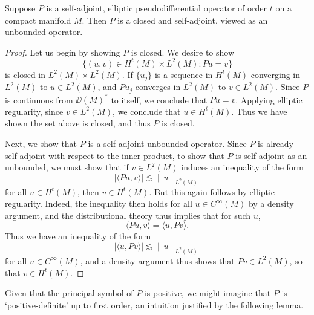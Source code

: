 \begin{theorem}
    Suppose $P$ is a self-adjoint, elliptic pseudodifferential operator of order $t$ on a compact manifold $M$. Then $P$ is a closed and self-adjoint, viewed as an unbounded operator.
\end{theorem}
\begin{proof}
    Let us begin by showing $P$ is closed. We desire to show
    \[ \{ (u,v) \in H^t(M) \times L^2(M) : Pu = v \} \]
    is closed in $L^2(M) \times L^2(M)$. If $\{ u_j \}$ is a sequence in $H^t(M)$ converging in $L^2(M)$ to $u \in L^2(M)$, and $Pu_j$ converges in $L^2(M)$ to $v \in L^2(M)$. Since $P$ is continuous from $\DD(M)^*$ to itself, we conclude that $Pu = v$. Applying elliptic regularity, since $v \in L^2(M)$, we conclude that $u \in H^t(M)$. Thus we have shown the set above is closed, and thus $P$ is closed.

    Next, we show that $P$ is a self-adjoint unbounded operator. Since $P$ is already self-adjoint with respect to the inner product, to show that $P$ is self-adjoint as an unbounded, we must show that if $v \in L^2(M)$ induces an inequality of the form
    \[ |\langle Pu, v \rangle| \lesssim \| u \|_{L^2(M)} \]
    for all $u \in H^t(M)$, then $v \in H^t(M)$. But this again follows by elliptic regularity. Indeed, the inequality then holds for all $u \in C^\infty(M)$ by a density argument, and the distributional theory thus implies that for such $u$,
    \[ \langle Pu, v \rangle = \langle u, Pv \rangle. \]
    Thus we have an inequality of the form
    \[ |\langle u, Pv \rangle| \lesssim \| u \|_{L^2(M)} \]
    for all $u \in C^\infty(M)$, and a density argument thus shows that $Pv \in L^2(M)$, so that $v \in H^t(M)$.
\end{proof}

Given that the principal symbol of $P$ is positive, we might imagine that $P$ is `positive-definite' up to first order, an intuition justified by the following lemma.

